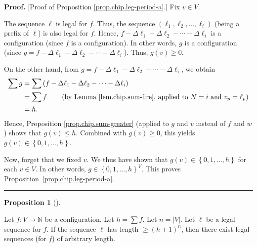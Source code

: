 \documentclass[numbers=enddot,12pt,final,onecolumn,notitlepage]{scrartcl}%
\theoremstyle{definition}
\newtheorem{prop}[theo]{Proposition}
\newenvironment{proposition}[1][]
{\begin{prop}[#1]\begin{leftbar}}
{\end{leftbar}\end{prop}}
\newenvironment{proof}[1][Proof]{\noindent\textbf{#1.} }{\ \rule{0.5em}{0.5em}}
\let\sumnonlimits\sum
\renewcommand{\sum}{\sumnonlimits\limits}
\newcommand{\NN}{\mathbb{N}}
\newcommand{\abs}[1]{\left| #1 \right|}
\newcommand{\tup}[1]{\left( #1 \right)}
\begin{document}
\begin{proof}
[Proof of Proposition \ref{prop.chip.leg-period-a}.] Fix $v\in V$.

The sequence $\ell$ is legal for $f$. Thus, the sequence
$\left( \ell_1, \ell_2, \ldots, \ell_i \right)$ (being a prefix of $\ell$)
is also legal for $f$.
Hence,
$f-\Delta\ell_{1}-\Delta\ell_{2}-\cdots-\Delta\ell_i$ is a
configuration (since $f$ is a configuration). In other words, $g$ is a
configuration (since $g=f-\Delta\ell_{1}-\Delta\ell_{2}-\cdots-\Delta\ell_i
$). Thus, $g\left(  v\right)  \geq0$.

On the other hand, from $g=f-\Delta\ell_{1}-\Delta\ell_{2}-\cdots-\Delta
\ell_i$, we obtain%
\begin{align*}
\sum g &  =\sum\left(  f-\Delta\ell_{1}-\Delta\ell_{2}-\cdots-\Delta\ell_i\right)  \\
&  =\sum f\qquad\left(
\text{by Lemma~\ref{lem.chip.sum-fire}, applied to } N = i \text{ and }
v_p = \ell_p
\right)  \\
&  =h.
\end{align*}
Hence, Proposition \ref{prop.chip.sum-greater} (applied to $g$ and $v$ instead
of $f$ and $w$) shows that $g\left(  v\right)  \leq h$. Combined with
$g\left(  v\right)  \geq0$, this yields $g\left(  v\right)  \in\left\{
0,1,\ldots,h\right\}  $.

Now, forget that we fixed $v$. We thus have shown that $g\left(  v\right)
\in\left\{  0,1,\ldots,h\right\}  $ for each $v\in V$. In other words,
$g\in\left\{  0,1,\ldots,h\right\}  ^{V}$.
This proves
Proposition~\ref{prop.chip.leg-period-a}.
\end{proof}

\begin{proposition} \label{prop.chip.leg-period-b}
Let $f : V \to \NN$ be a configuration.
Let $h = \sum f$.
Let $n = \abs{V}$.
Let $\ell$ be a legal sequence for $f$.
If the sequence $\ell$ has length
$\geq \tup{h+1}^n$, then there exist legal sequences (for $f$)
of arbitrary length.
\end{proposition}
\end{document}
